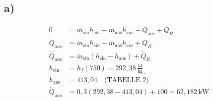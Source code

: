 

\subsection*{a)}

\begin{align*}
0 &= \dot{m}_{\text{ein}} h_{\text{ein}} - \dot{m}_{\text{aus}} h_{\text{aus}} - \dot{Q}_{\text{aus}} + \dot{Q}_R \\
\dot{Q}_{\text{aus}} &= \dot{m}_{\text{ein}} h_{\text{ein}} - \dot{m}_{\text{aus}} h_{\text{aus}} + \dot{Q}_R \\
\dot{Q}_{\text{aus}} &= \dot{m}_{\text{ein}} (h_{\text{ein}} - h_{\text{aus}}) + \dot{Q}_R \\
h_{\text{ein}} &= h_f(750) = 292,38 \, \frac{\text{kJ}}{\text{kg}} \\
h_{\text{aus}} &= 413,04 \quad \text{(TABELLE 2)} \\
\dot{Q}_{\text{aus}} &= 0,3 \left( 292,38 - 413,04 \right) + 100 = 62,182 \, \text{kW}
\end{align*}